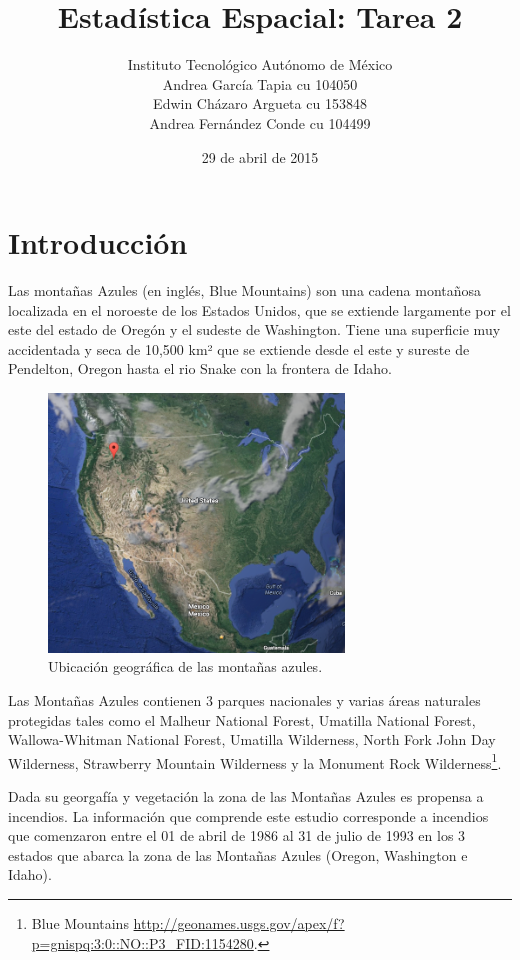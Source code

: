 \documentclass[12,]{article}
\title{Estadística Espacial: Tarea 2}
\author{Instituto Tecnológico Autónomo de México \\ Andrea García Tapia cu 104050 \\ Edwin Cházaro Argueta cu 153848 \\ Andrea Fernández Conde cu 104499}
\date{29 de abril de 2015}
\let\rmarkdownfootnote\footnote%
\def\footnote{\protect\rmarkdownfootnote}
\begin{document}
\maketitle


{
\hypersetup{linkcolor=black}
\setcounter{tocdepth}{2}
\tableofcontents
}
\pagebreak

\section{Introducción}\label{introduccion}

Las montañas Azules (en inglés, Blue Mountains) son una cadena montañosa
localizada en el noroeste de los Estados Unidos, que se extiende
largamente por el este del estado de Oregón y el sudeste de Washington.
Tiene una superficie muy accidentada y seca de 10,500 km² que se
extiende desde el este y sureste de Pendelton, Oregon hasta el rio Snake
con la frontera de Idaho.

\begin{figure}[H]
\centering
\includegraphics[width=0.7\textwidth]{imagenes/usa.png}
\caption{Ubicación geográfica de las montañas azules.}

\end{figure}

Las Montañas Azules contienen 3 parques nacionales y varias áreas
naturales protegidas tales como el Malheur National Forest, Umatilla
National Forest, Wallowa-Whitman National Forest, Umatilla Wilderness,
North Fork John Day Wilderness, Strawberry Mountain Wilderness y la
Monument Rock Wilderness\footnote{Blue Mountains
  \url{http://geonames.usgs.gov/apex/f?p=gnispq:3:0::NO::P3_FID:1154280}.}.

Dada su georgafía y vegetación la zona de las Montañas Azules es
propensa a incendios. La información que comprende este estudio
corresponde a incendios que comenzaron entre el 01 de abril de 1986 al
31 de julio de 1993 en los 3 estados que abarca la zona de las Montañas
Azules (Oregon, Washington e Idaho).
\end{document}
